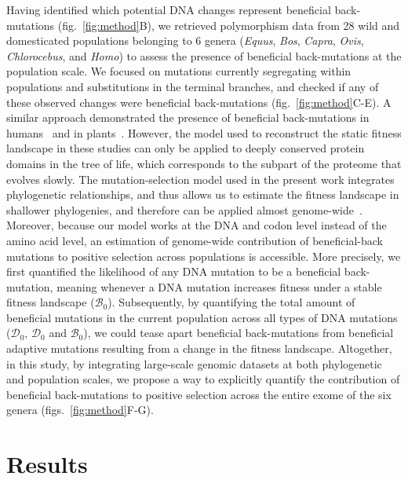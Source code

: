 \documentclass{article}
\newcommand{\SphyDel}{\mathcal{D}_0}
\newcommand{\SphyBen}{\mathcal{B}_0}
\begin{document}
    Having identified which potential DNA changes represent beneficial back-mutations (fig.~\ref{fig:method}B), we retrieved polymorphism data from 28 wild and domesticated populations belonging to 6 genera (\textit{Equus}, \textit{Bos}, \textit{Capra}, \textit{Ovis}, \textit{Chlorocebus}, and \textit{Homo}) to assess the presence of beneficial back-mutations at the population scale.
    We focused on mutations currently segregating within populations and substitutions in the terminal branches, and checked if any of these observed changes were beneficial back-mutations (fig.~\ref{fig:method}C-E).
    A similar approach demonstrated the presence of beneficial back-mutations in humans~\cite{moses_inferring_2009, fischer_germline_2011} and in plants~\cite{chen_hunting_2021}.
    However, the model used to reconstruct the static fitness landscape in these studies can only be applied to deeply conserved protein domains in the tree of life, which corresponds to the subpart of the proteome that evolves slowly.
    The mutation-selection model used in the present work integrates phylogenetic relationships, and thus allows us to estimate the fitness landscape in shallower phylogenies, and therefore can be applied almost genome-wide~\cite{rodrigue_mutationselection_2010}.
    Moreover, because our model works at the DNA and codon level instead of the amino acid level, an estimation of genome-wide contribution of beneficial-back mutations to positive selection across populations is accessible.
    More precisely, we first quantified the likelihood of any DNA mutation to be a beneficial back-mutation, meaning whenever a DNA mutation increases fitness under a stable fitness landscape ($\SphyBen$).
    Subsequently, by quantifying the total amount of beneficial mutations in the current population across all types of DNA mutations ($\SphyDel$, $\SphyDel$ and $\SphyBen$), we could tease apart beneficial back-mutations from beneficial adaptive mutations resulting from a change in the fitness landscape.
    Altogether, in this study, by integrating large-scale genomic datasets at both phylogenetic and population scales, we propose a way to explicitly quantify the contribution of beneficial back-mutations to positive selection across the entire exome of the six genera (figs.~\ref{fig:method}F-G).

    \section*{Results}
\end{document}
